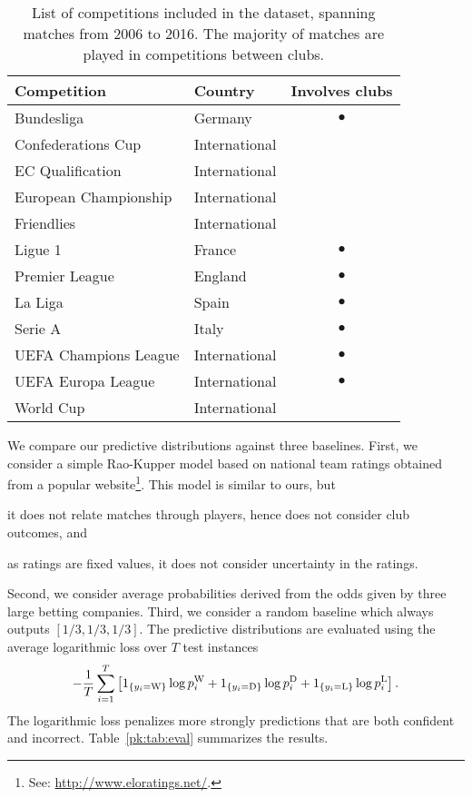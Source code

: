 \begin{table}
  \caption{
List of competitions included in the dataset, spanning matches from 2006 to 2016.
The majority of matches are played in competitions between clubs.}
  \label{pk:tab:competitions}
  \centering
  \begin{tabular}{llc}
    \toprule
    Competition           & Country       & Involves clubs      \\
    \midrule
    Bundesliga            & Germany       & $\bullet$     \\
    Confederations Cup    & International & \\
    EC Qualification      & International & \\
    European Championship & International & \\
    Friendlies            & International & \\
    Ligue 1               & France        & $\bullet$     \\
    Premier League        & England       & $\bullet$     \\
    La Liga               & Spain         & $\bullet$     \\
    Serie A               & Italy         & $\bullet$     \\
    UEFA Champions League & International & $\bullet$     \\
    UEFA Europa League    & International & $\bullet$     \\
    World Cup             & International & \\
    \bottomrule
  \end{tabular}
\end{table}

We compare our predictive distributions against three baselines.
First, we consider a simple Rao-Kupper model based on national team ratings obtained from a popular website\footnote{See: \url{http://www.eloratings.net/}.}.
This model is similar to ours, but
\begin{enuminline}
\item it does not relate matches through players, hence does not consider club outcomes, and
\item as ratings are fixed values, it does not consider uncertainty in the ratings.
\end{enuminline}
Second, we consider average probabilities derived from the odds given by three large betting companies.
Third, we consider a random baseline which always outputs $[1/3, 1/3, 1/3]$.
The predictive distributions are evaluated using the average logarithmic loss over $T$ test instances
\begin{align*}
- \frac{1}{T} \sum_{i=1}^{T} \left[
1_{\left \{ y_i = \text{W} \right \} } \log p^{\text{W}}_i
+ 1_{\left \{ y_i = \text{D} \right \} } \log p^{\text{D}}_i
+ 1_{\left \{ y_i = \text{L} \right \} } \log p^{\text{L}}_i
\right].
\end{align*}
The logarithmic loss penalizes more strongly predictions that are both confident and incorrect.
Table~\ref{pk:tab:eval} summarizes the results.




